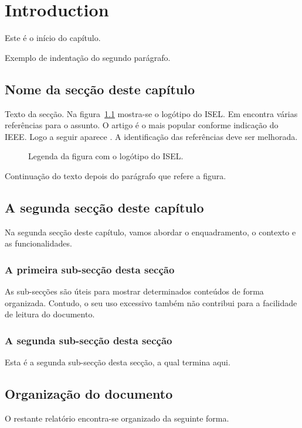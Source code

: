 %
%
\chapter{Introduction} \label{cap:intro}

Este é o início do capítulo.

Exemplo de indentação do segundo parágrafo.

%
%
\section{Nome da secção deste capítulo} \label{sec11}

Texto da secção. Na figura~\ref{fig:logotipo} mostra-se o logótipo do ISEL. Em \cite{wiki:bigdata2019} encontra várias referências para o assunto. O artigo \cite{6547630} é o mais popular conforme indicação do IEEE. Logo a seguir aparece \cite{6824752}. A identificação das referências deve ser melhorada.

\begin{figure}[h]
\begin{center}
\end{center}
\caption{Legenda da figura com o logótipo do ISEL.}\label{fig:logotipo}
\end{figure}

Continuação do texto depois do parágrafo que refere a figura.


%
%
\section{A segunda secção deste capítulo} \label{sec12}
Na segunda secção deste capítulo, vamos abordar o enquadramento,
o contexto e as funcionalidades.

%
%
\subsection{A primeira sub-secção desta secção} \label{sec121}
As sub-secções são úteis para mostrar determinados conteúdos de forma
organizada. Contudo, o seu uso excessivo também não contribui para a facilidade
de leitura do documento.

%
%
\subsection{A segunda sub-secção desta secção} \label{sec122}
Esta é a segunda sub-secção desta secção, a qual termina aqui.


%
%
\section{Organização do documento} \label{sec13}
O restante relatório encontra-se organizado da seguinte forma.